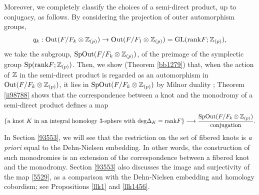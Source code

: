 \documentclass{article}
\theoremstyle{plain}
\theoremstyle{definition}
\newcommand{\lra}{\longrightarrow}
\newcommand{\ra}{\rightarrow}
\newcommand{\Z}{{\Bbb Z}}
\newcommand{\Out}{{\rm Out}}
\newcommand{\Sp}{{\rm Sp}}
\newcommand{\GL}{{\rm GL}}
\newcommand{\SpOut}{{\rm SpOut}}
\begin{document}
{Moreover, we completely classify the choices of a semi-direct product, up to conjugacy, as follows. %
By considering the projection of outer automorphism groups,
$$q_k: \Out(F/F_{k } \otimes \Z_{(p)}) \ra \Out(F/F_{1} \otimes \Z_{(p)}) =\GL(\mathrm{rank}F; \Z_{(p)}),$$
we take the subgroup, $ \SpOut(F/F_{k } \otimes \Z_{(p)}) $, of the preimage of the symplectic group $\Sp(\mathrm{rank}F; \Z_{(p)})$. Then, we show (Theorem \ref{bb1279}) that, when the action of $\Z$ in the semi-direct product is regarded as an automorphism in $\Out(F/F_{k } \otimes \Z_{(p)}) $, it lies in $ \SpOut(F/F_{k } \otimes \Z_{(p)})$ by Milnor duality \cite{Mil}; Theorem \ref{ii98788} shows that the correspondence between a knot and the monodromy of a semi-direct product defines a map
\begin{equation}\label{5529}
\{ \textrm{a knot }K \textrm{ in an integral homology 3-sphere with deg}\Delta_K=\mathrm{rank}F \} \lra \frac{\SpOut(F/F_{k } \otimes \Z_{(p)})}{ \mathrm{conjugation}}.
\end{equation}
In Section \ref{93553}, we will see that the restriction on the set of fibered knots is {\it a priori} equal to the Dehn-Nielsen embedding. In other words, the construction of such monodromies is an extension of the correspondence between a fibered knot and the monodromy.
Section \ref{93553} also discusses the image and surjectivity of the map \eqref{5529}, as a comparison with the Dehn-Nielsen embedding and homology cobordism;
see Propositions \ref{llk1} and \ref{llk1456}. 



}
\end{document}
